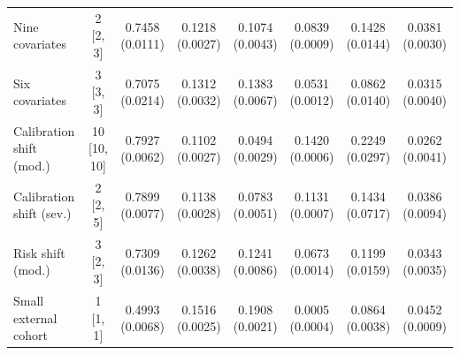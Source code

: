 \documentclass{article} %
\begin{document}
\begin{table}[!htbp]
\begin{tabular}{@{}lccccccc@{}}
Nine covariates & 2 [2, 3] & \shortstack{0.7458\\(0.0111)} & \shortstack{0.1218\\(0.0027)} & \shortstack{0.1074\\(0.0043)} & \shortstack{0.0839\\(0.0009)} & \shortstack{0.1428\\(0.0144)} & \shortstack{0.0381\\(0.0030)} \\
Six covariates & 3 [3, 3] & \shortstack{0.7075\\(0.0214)} & \shortstack{0.1312\\(0.0032)} & \shortstack{0.1383\\(0.0067)} & \shortstack{0.0531\\(0.0012)} & \shortstack{0.0862\\(0.0140)} & \shortstack{0.0315\\(0.0040)} \\
Calibration shift (mod.) & 10 [10, 10] & \shortstack{0.7927\\(0.0062)} & \shortstack{0.1102\\(0.0027)} & \shortstack{0.0494\\(0.0029)} & \shortstack{0.1420\\(0.0006)} & \shortstack{0.2249\\(0.0297)} & \shortstack{0.0262\\(0.0041)} \\
Calibration shift (sev.) & 2 [2, 5] & \shortstack{0.7899\\(0.0077)} & \shortstack{0.1138\\(0.0028)} & \shortstack{0.0783\\(0.0051)} & \shortstack{0.1131\\(0.0007)} & \shortstack{0.1434\\(0.0717)} & \shortstack{0.0386\\(0.0094)} \\
Risk shift (mod.) & 3 [2, 3] & \shortstack{0.7309\\(0.0136)} & \shortstack{0.1262\\(0.0038)} & \shortstack{0.1241\\(0.0086)} & \shortstack{0.0673\\(0.0014)} & \shortstack{0.1199\\(0.0159)} & \shortstack{0.0343\\(0.0035)} \\
Small external cohort & 1 [1, 1] & \shortstack{0.4993\\(0.0068)} & \shortstack{0.1516\\(0.0025)} & \shortstack{0.1908\\(0.0021)} & \shortstack{0.0005\\(0.0004)} & \shortstack{0.0864\\(0.0038)} & \shortstack{0.0452\\(0.0009)} \\

\bottomrule
\end{tabular}
\end{table}
\end{document}
